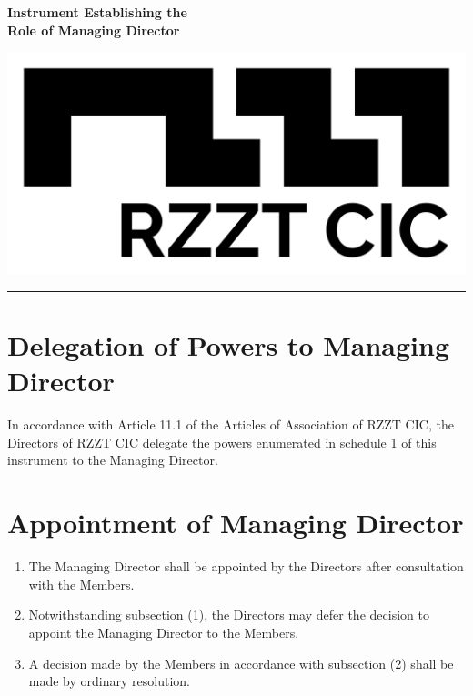 \documentclass[a4paper,10pt]{article}
\begin{document}
\thispagestyle{firstpage}

\begin{minipage}[b]{0.75\textwidth}
  \raggedright
  \LARGE{\textbf{Instrument Establishing the\\Role of Managing Director}}
  \vspace{0.05em}
\end{minipage}
%
\begin{minipage}[b]{0.25\textwidth}
  \raggedleft
  \includegraphics[width=1\textwidth]{logo-black.jpg}
\end{minipage}

\hrule

\vspace{2em}

\section{Delegation of Powers to Managing Director}

In accordance with Article 11.1 of the Articles of Association of RZZT CIC, the Directors of RZZT CIC delegate the powers enumerated in schedule 1 of this instrument to the Managing Director.

\section{Appointment of Managing Director}

\begin{enumerate}
  \item The Managing Director shall be appointed by the Directors after consultation with the Members.
  \item Notwithstanding subsection (1), the Directors may defer the decision to appoint the Managing Director to the Members.
  \item A decision made by the Members in accordance with subsection (2) shall be made by ordinary resolution.
\end{enumerate}
\end{document}
